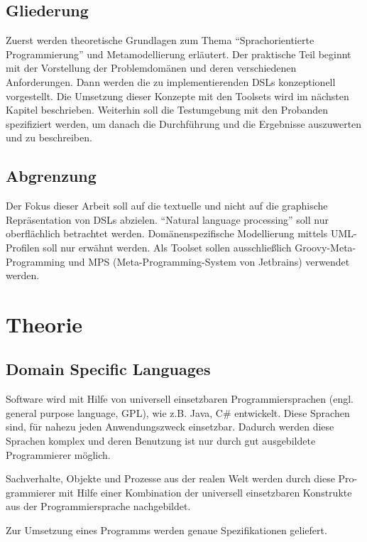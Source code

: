 \documentclass[11pt,english,ngerman, headsepline]{scrreprt}
\begin{document}
\section{Gliederung}

Zuerst werden theoretische Grundlagen zum Thema “Sprachorientierte
Programmierung” und Metamodellierung erläutert. Der praktische Teil beginnt mit
der Vorstellung der Problemdomänen und deren verschiedenen Anforderungen. Dann
werden die zu implementierenden DSLs konzeptionell vorgestellt. Die Umsetzung
dieser Konzepte mit den Toolsets wird im nächsten Kapitel beschrieben. Weiterhin
soll die Testumgebung mit den Probanden spezifiziert werden, um danach die
Durchführung und die Ergebnisse auszuwerten und zu beschreiben.



\section{Abgrenzung}
Der Fokus dieser Arbeit soll auf die textuelle und nicht auf die graphische
Repräsentation von DSLs abzielen. “Natural language processing” soll nur
oberflächlich betrachtet werden. Domänenspezifische Modellierung mittels
UML-Profilen soll nur erwähnt werden. Als Toolset sollen
ausschließlich Groovy-Meta-Programming und MPS (Meta-Programming-System von
Jetbrains) verwendet werden.

\chapter{Theorie}

\section{Domain Specific Languages}
 
 
Software wird mit Hilfe von universell einsetzbaren Programmiersprachen  (engl.
general purpose language, GPL), wie z.B. Java, C\# entwickelt. Diese Sprachen
sind, für nahezu jeden Anwendungszweck einsetzbar.
Dadurch werden diese Sprachen komplex und deren Benutzung ist nur durch gut
ausgebildete Programmierer möglich.



Sachverhalte, Objekte und Prozesse aus der realen Welt werden durch diese Pro-
grammierer mit Hilfe einer Kombination der universell einsetzbaren Konstrukte
aus der Programmiersprache nachgebildet. 

Zur Umsetzung eines Programms werden genaue Spezifikationen geliefert.  
\end{document}
